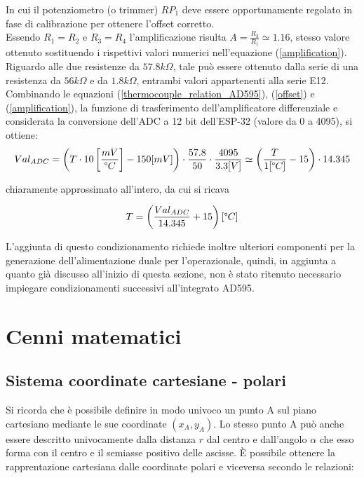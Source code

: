 \documentclass[12pt]{article}
\begin{document}
        \noindent
        In cui il potenziometro (o trimmer) $RP_1$ deve essere opportunamente regolato in fase di calibrazione per ottenere l'offset corretto.\\
        Essendo $R_1=R_2$ e $R_3=R_4$ l'amplificazione risulta $A = \frac{R_3}{R_1} \simeq 1.16$, stesso valore ottenuto sostituendo i rispettivi valori numerici nell'equazione (\ref{amplification}). Riguardo alle due resistenze da $57.8 k\Omega$, tale può essere ottenuto dalla serie di una resistenza da $56 k\Omega$ e da $1.8 k\Omega$, entrambi valori appartenenti alla serie E12.\\
        Combinando le equazioni (\ref{thermocouple_relation_AD595}), (\ref{offset}) e (\ref{amplification}), la funzione di trasferimento dell'amplificatore differenziale e considerata la conversione dell'ADC a 12 bit dell'ESP-32 (valore da 0 a 4095), si ottiene:
        \begin{equation}
            Val_{ADC} = \left( T \cdot 10 \left[ \frac{mV}{\degree C} \right] - 150 [mV] \right) \cdot \frac{57.8}{50} \cdot \frac{4095}{3.3[V]} \simeq \left( \frac{T}{1 [\degree C]} - 15 \right) \cdot  14.345
        \end{equation}
        
        \noindent
        chiaramente approssimato all'intero, da cui si ricava
        
        \begin{equation}
            T = \left( \frac{Val_{ADC}}{14.345} + 15 \right) [\degree C]
        \end{equation}
    
        \noindent
        L'aggiunta di questo condizionamento richiede inoltre ulteriori componenti per la generazione dell'alimentazione duale per l'operazionale, quindi, in aggiunta a quanto già discusso all'inizio di questa sezione, non è stato ritenuto necessario impiegare condizionamenti successivi all'integrato AD595.


\section{Cenni matematici}
    \subsection{Sistema coordinate cartesiane - polari}
    Si ricorda che è possibile definire in modo univoco un punto A sul piano cartesiano mediante le sue coordinate $(x_A, y_A)$. Lo stesso punto A può anche essere descritto univocamente dalla distanza $r$ dal centro e dall'angolo $\alpha$ che esso forma con il centro e il semiasse positivo delle ascisse. È possibile ottenere la rapprentazione cartesiana dalle coordinate polari e viceversa secondo le relazioni:
    
\end{document}
